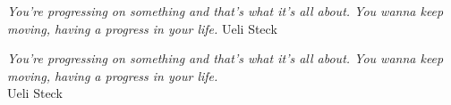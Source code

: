 \thispagestyle{empty}
\vspace*{\fill}
\emph{
    You're progressing on something and that's what it's all about. You wanna keep moving, having a progress in your life.
}
\vspace{2cm}
\hfill Ueli Steck

\vspace{4cm}

\emph{
    You're progressing on something and that's what it's all about. You wanna keep moving, having a progress in your life.\\
}
\hfill Ueli Steck
\vspace*{\fill}


